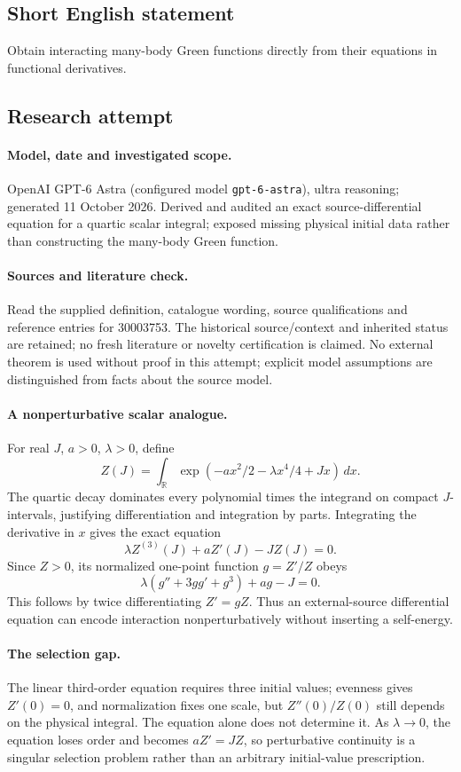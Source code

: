 \documentclass[11pt]{article}
\begin{document}
\subsection{Short English statement}
Obtain interacting many-body Green functions directly from their equations in functional derivatives.
\subsection{Research attempt}
\paragraph{Model, date and investigated scope.}
OpenAI GPT-6 Astra (configured model \texttt{gpt-6-astra}), ultra reasoning; generated 11 October 2026. Derived and audited an exact source-differential equation for a quartic scalar integral; exposed missing physical initial data rather than constructing the many-body Green function.

\paragraph{Sources and literature check.}
Read the supplied definition, catalogue wording, source qualifications and reference entries for 30003753. The historical source/context and inherited status are retained; no fresh literature or novelty certification is claimed. No external theorem is used without proof in this attempt; explicit model assumptions are distinguished from facts about the source model.

\paragraph{A nonperturbative scalar analogue.} For real \(J\), \(a>0\), \(\lambda>0\), define
\[
 Z(J)=\int_{\mathbb R}\exp(-ax^2/2-\lambda x^4/4+Jx)\,dx.
\]
The quartic decay dominates every polynomial times the integrand on compact \(J\)-intervals, justifying differentiation and integration by parts. Integrating the derivative in \(x\) gives the exact equation
\[
 \lambda Z^{(3)}(J)+aZ'(J)-JZ(J)=0.
\]
Since \(Z>0\), its normalized one-point function \(g=Z'/Z\) obeys
\[
 \lambda(g''+3gg'+g^3)+ag-J=0.
\]
This follows by twice differentiating \(Z'=gZ\). Thus an external-source differential equation can encode interaction nonperturbatively without inserting a self-energy.
\paragraph{The selection gap.} The linear third-order equation requires three initial values; evenness gives \(Z'(0)=0\), and normalization fixes one scale, but \(Z''(0)/Z(0)\) still depends on the physical integral. The equation alone does not determine it. As \(\lambda\to0\), the equation loses order and becomes \(aZ'=JZ\), so perturbative continuity is a singular selection problem rather than an arbitrary initial-value prescription.
\end{document}
